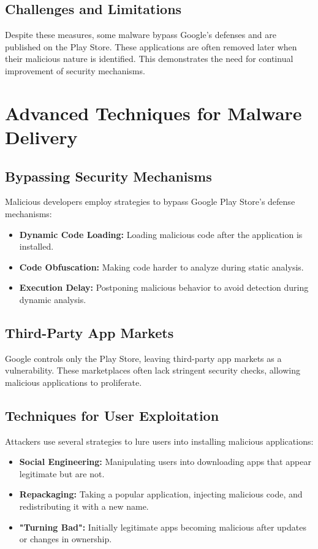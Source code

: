 \documentclass{article}
\begin{document}
\subsection{Challenges and Limitations}
Despite these measures, some malware bypass Google's defenses and are published on the Play Store. These applications are often removed later when their malicious nature is identified. This demonstrates the need for continual improvement of security mechanisms.

\section{Advanced Techniques for Malware Delivery}

\subsection{Bypassing Security Mechanisms}
Malicious developers employ strategies to bypass Google Play Store's defense mechanisms:
\begin{itemize}
    \item \textbf{Dynamic Code Loading:} Loading malicious code after the application is installed.
    \item \textbf{Code Obfuscation:} Making code harder to analyze during static analysis.
    \item \textbf{Execution Delay:} Postponing malicious behavior to avoid detection during dynamic analysis.
\end{itemize}

\subsection{Third-Party App Markets}
Google controls only the Play Store, leaving third-party app markets as a vulnerability. These marketplaces often lack stringent security checks, allowing malicious applications to proliferate.

\subsection{Techniques for User Exploitation}
Attackers use several strategies to lure users into installing malicious applications:
\begin{itemize}
    \item \textbf{Social Engineering:} Manipulating users into downloading apps that appear legitimate but are not.
    \item \textbf{Repackaging:} Taking a popular application, injecting malicious code, and redistributing it with a new name.
    \item \textbf{"Turning Bad":} Initially legitimate apps becoming malicious after updates or changes in ownership.
\end{itemize}
\end{document}

